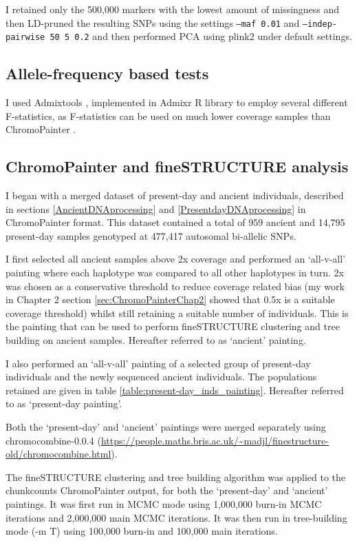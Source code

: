 I retained only the 500,000 markers with the lowest amount of missingness and then LD-pruned the resulting SNPs using the settings \texttt{--maf 0.01} and \texttt{--indep-pairwise 50 5 0.2} and then performed PCA using plink2 under default settings. 

\subsection{Allele-frequency based tests}

I used Admixtools \cite{Patterson2012}, implemented in Admixr R library \cite{admixrpetr2019} to employ several different F-statistics, as F-statistics can be used on much lower coverage samples than ChromoPainter \cite{AssessingqpAdm}. 

\subsection{ChromoPainter and fineSTRUCTURE analysis}

I began with a merged dataset of present-day and ancient individuals, described in sections \ref{AncientDNAprocessing} and \ref{PresentdayDNAprocessing} in ChromoPainter format. This dataset contained a total of 959 ancient and 14,795 present-day samples genotyped at 477,417 autosomal bi-allelic SNPs. 

I first selected all ancient samples above 2x coverage and performed an `all-v-all' painting where each haplotype was compared to all other haplotypes in turn. 2x was chosen as a conservative threshold to reduce coverage related bias (my work in Chapter 2 section \ref{sec:ChromoPainterChap2} showed that 0.5x is a suitable coverage threshold) whilst still retaining a suitable number of individuals. This is the painting that can be used to perform fineSTRUCTURE clustering and tree building on ancient samples. Hereafter referred to as `ancient' painting.

I also performed an `all-v-all' painting of a selected group of present-day individuals and the newly sequenced ancient individuals. The populations retained are given in table \ref{table:present-day_inds_painting}. Hereafter referred to as `present-day painting'.

Both the `present-day' and `ancient' paintings were merged separately using chromocombine-0.0.4 (\url{https://people.maths.bris.ac.uk/~madjl/finestructure-old/chromocombine.html}). 

The fineSTRUCTURE \cite{Lawson2012} clustering and tree building algorithm was applied to the chunkcounts ChromoPainter output, for both the `present-day' and `ancient' paintings. It was first run in MCMC mode using 1,000,000 burn-in MCMC iterations and 2,000,000 main MCMC iterations. It was then run in tree-building mode (-m T) using 100,000 burn-in and 100,000 main iterations.

